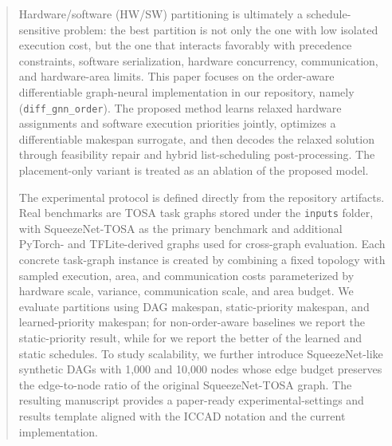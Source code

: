 \begin{abstract}
Hardware/software (HW/SW) partitioning is ultimately a schedule-sensitive problem: the best partition is not only the one with low isolated execution cost, but the one that interacts favorably with precedence constraints, software serialization, hardware concurrency, communication, and hardware-area limits. This paper focuses on the order-aware differentiable graph-neural implementation in our repository, namely \diffgnnorder (\texttt{diff\_gnn\_order}). The proposed method learns relaxed hardware assignments and software execution priorities jointly, optimizes a differentiable makespan surrogate, and then decodes the relaxed solution through feasibility repair and hybrid list-scheduling post-processing. The placement-only \diffgnn variant is treated as an ablation of the proposed model.

The experimental protocol is defined directly from the repository artifacts. Real benchmarks are TOSA task graphs stored under the \texttt{inputs} folder, with SqueezeNet-TOSA as the primary benchmark and additional PyTorch- and TFLite-derived graphs used for cross-graph evaluation. Each concrete task-graph instance is created by combining a fixed topology with sampled execution, area, and communication costs parameterized by hardware scale, variance, communication scale, and area budget. We evaluate partitions using DAG makespan, static-priority makespan, and learned-priority makespan; for non-order-aware baselines we report the static-priority result, while for \diffgnnorder we report the better of the learned and static schedules. To study scalability, we further introduce SqueezeNet-like synthetic DAGs with 1,000 and 10,000 nodes whose edge budget preserves the edge-to-node ratio of the original SqueezeNet-TOSA graph. The resulting manuscript provides a paper-ready experimental-settings and results template aligned with the ICCAD notation and the current implementation.
\end{abstract}
